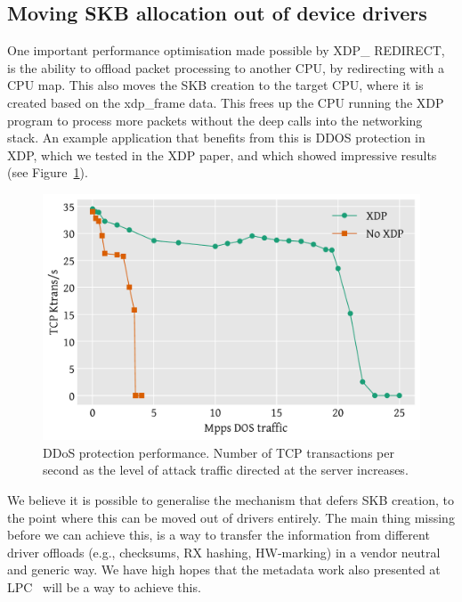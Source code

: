 \documentclass[sigconf]{acmart}
\begin{document}
\subsection{Moving SKB allocation out of device drivers}
\label{sec:moving-skb-alloc}

One important performance optimisation made possible by XDP\_ REDIRECT, is the
ability to offload packet processing to another CPU, by redirecting with a CPU
map. This also moves the SKB creation to the target CPU, where it is created
based on the xdp\_frame data. This frees up the CPU running the XDP program to
process more packets without the deep calls into the networking stack. An
example application that benefits from this is DDOS protection in XDP, which we
tested in the XDP paper, and which showed impressive results (see
Figure~\ref{fig:ddos-results}).

\begin{figure}[t]
\centering
\includegraphics[width=\linewidth]{images/ddos-test.pdf}
\caption{\label{fig:ddos-results} DDoS protection performance. Number of TCP
  transactions per second as the level of attack traffic directed at the server
  increases.}
\end{figure}

We believe it is possible to generalise the mechanism that defers SKB creation,
to the point where this can be moved out of drivers entirely. The main thing
missing before we can achieve this, is a way to transfer the information from
different driver offloads (e.g., checksums, RX hashing, HW-marking) in a vendor
neutral and generic way. We have high hopes that the metadata work also
presented at LPC~\cite{xdp-metadata} will be a way to achieve this.
\end{document}
